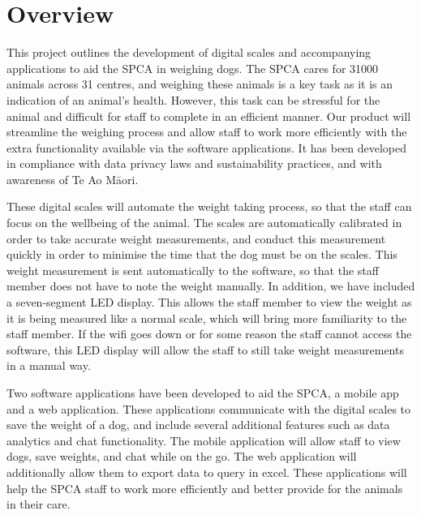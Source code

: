 
\chapter{Overview}

This project outlines the development of digital scales and accompanying applications to aid the SPCA in weighing dogs. The SPCA cares for 31000 animals across 31 centres, and weighing these animals is a key task as it is an indication of an animal's health. However, this task can be stressful for the animal and difficult for staff to complete in an efficient manner. Our product will streamline the weighing process and allow staff to work more efficiently with the extra functionality available via the software applications. It has been developed in compliance with data privacy laws and sustainability practices, and with awareness of Te Ao Māori. 

These digital scales will automate the weight taking process, so that the staff can focus on the wellbeing of the animal. The scales are automatically calibrated in order to take accurate weight measurements, and conduct this measurement quickly in order to minimise the time that the dog must be on the scales. This weight measurement is sent automatically to the software, so that the staff member does not have to note the weight manually. In addition, we have included a seven-segment LED display. This allows the staff member to view the weight as it is being measured like a normal scale, which will bring more familiarity to the staff member. If the wifi goes down or for some reason the staff cannot access the software, this LED display will allow the staff to still take weight measurements in a manual way.

Two software applications have been developed to aid the SPCA, a mobile app and a web application. These applications communicate with the digital scales to save the weight of a dog, and include several additional features such as data analytics and chat functionality. The mobile application will allow staff to view dogs, save weights, and chat while on the go. The web application will additionally allow them to export data to query in excel. These applications will help the SPCA staff to work more efficiently and better provide for the animals in their care. 

